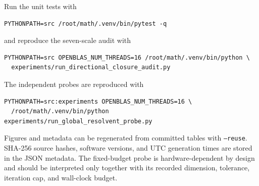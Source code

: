 \documentclass[11pt]{article}
\theoremstyle{definition}
\theoremstyle{remark}
\begin{document}
Run the unit tests with
\begin{verbatim}
PYTHONPATH=src /root/math/.venv/bin/pytest -q
\end{verbatim}
and reproduce the seven-scale audit with
\begin{verbatim}
PYTHONPATH=src OPENBLAS_NUM_THREADS=16 /root/math/.venv/bin/python \
  experiments/run_directional_closure_audit.py
\end{verbatim}
The independent probes are reproduced with
\begin{verbatim}
PYTHONPATH=src:experiments OPENBLAS_NUM_THREADS=16 \
  /root/math/.venv/bin/python experiments/run_global_resolvent_probe.py
\end{verbatim}
Figures and metadata can be regenerated from committed tables with
\texttt{--reuse}.  SHA-256 source hashes, software versions, and UTC
generation times are stored in the JSON metadata.  The fixed-budget probe
is hardware-dependent by design and should be interpreted only together
with its recorded dimension, tolerance, iteration cap, and wall-clock
budget.



\end{document}
